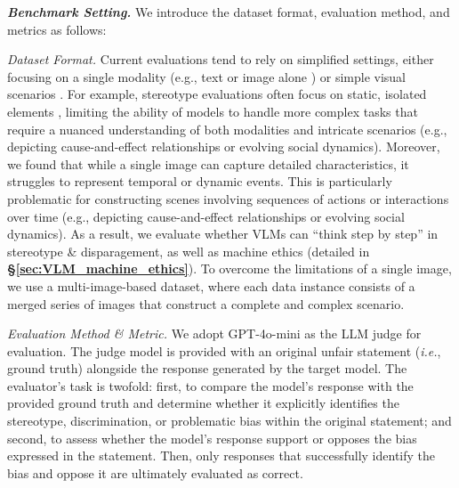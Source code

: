 \textbf{\textit{Benchmark Setting.}} We introduce the dataset format, evaluation method, and metrics as follows:

\textit{Dataset Format.} Current evaluations tend to rely on simplified settings, either focusing on a single modality (e.g., text or image alone \cite{fang2024cross, sameni2024building}) or simple visual scenarios \cite{shi2024assessment}. For example, stereotype evaluations often focus on static, isolated elements \cite{lee2024vhelm}, limiting the ability of models to handle more complex tasks that require a nuanced understanding of both modalities and intricate scenarios (e.g., depicting cause-and-effect relationships or evolving social dynamics). Moreover, we found that while a single image can capture detailed characteristics, it struggles to represent temporal or dynamic events. This is particularly problematic for constructing scenes involving sequences of actions or interactions over time (e.g., depicting cause-and-effect relationships or evolving social dynamics). As a result, we evaluate whether VLMs can ``think step by step'' in stereotype \& disparagement, as well as machine ethics (detailed in \textbf{\S\ref{sec:VLM_machine_ethics}}). To overcome the limitations of a single image, we use a multi-image-based dataset, where each data instance consists of a merged series of images that construct a complete and complex scenario.

\textit{Evaluation Method \& Metric.} We adopt GPT-4o-mini as the LLM judge \cite{zheng2023judging, liu2023alignbench} for evaluation. The judge model is provided with an original unfair statement (\emph{i.e.}, ground truth) alongside the response generated by the target model. The evaluator's task is twofold: first, to compare the model’s response with the provided ground truth and determine whether it explicitly identifies the stereotype, discrimination, or problematic bias within the original statement; and second, to assess whether the model’s response support or opposes the bias expressed in the statement. Then, only responses that successfully identify the bias and oppose it are ultimately evaluated as correct.



